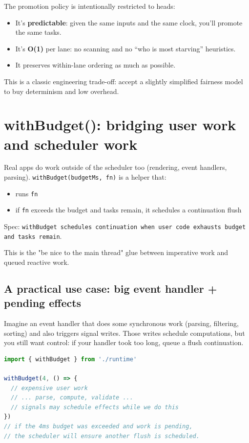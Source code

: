 The promotion policy is intentionally restricted to heads:

\begin{itemize}
  \item It's \textbf{predictable}: given the same inputs and the same clock, you'll promote the same tasks.
  \item It's \textbf{O(1)} per lane: no scanning and no ``who is most starving'' heuristics.
  \item It preserves within-lane ordering as much as possible.
\end{itemize}

This is a classic engineering trade-off: accept a slightly simplified fairness model to buy determinism and low overhead.

\section{withBudget(): bridging user work and scheduler work}

Real apps do work outside of the scheduler too (rendering, event handlers, parsing).
\texttt{withBudget(budgetMs, fn)} is a helper that:

\begin{itemize}
  \item runs \texttt{fn}
  \item if \texttt{fn} exceeds the budget and tasks remain, it schedules a continuation flush
\end{itemize}

Spec: \texttt{withBudget schedules continuation when user code exhausts budget and tasks remain}.

This is the "be nice to the main thread" glue between imperative work and queued reactive work.

\subsection{A practical use case: big event handler + pending effects}

Imagine an event handler that does some synchronous work (parsing, filtering, sorting) and also triggers signal writes.
Those writes schedule computations, but you still want control: if your handler took too long, queue a flush continuation.

\begin{lstlisting}[language=JavaScript]
import { withBudget } from './runtime'

withBudget(4, () => {
  // expensive user work
  // ... parse, compute, validate ...
  // signals may schedule effects while we do this
})
// if the 4ms budget was exceeded and work is pending,
// the scheduler will ensure another flush is scheduled.
\end{lstlisting}

